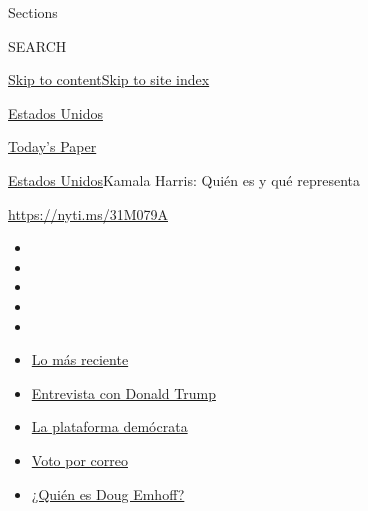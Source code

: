 Sections

SEARCH

\protect\hyperlink{site-content}{Skip to
content}\protect\hyperlink{site-index}{Skip to site index}

\href{https://www.nytimes3xbfgragh.onion/es/section/estados-unidos}{Estados
Unidos}

\href{https://myaccount.nytimes3xbfgragh.onion/auth/login?response_type=cookie\&client_id=vi}{}

\href{https://www.nytimes3xbfgragh.onion/section/todayspaper}{Today's
Paper}

\href{/es/section/estados-unidos}{Estados Unidos}\textbar{}Kamala
Harris: Quién es y qué representa

\url{https://nyti.ms/31M079A}

\begin{itemize}
\item
\item
\item
\item
\item
\end{itemize}

\begin{itemize}
\item
  \href{https://www.nytimes3xbfgragh.onion/es/2020/09/07/espanol/estados-unidos/trump-biden-encuestas-elecciones.html?action=click\&pgtype=Article\&state=default\&region=TOP_BANNER\&context=storylines_menu}{Lo
  más reciente}
\item
  \href{https://www.nytimes3xbfgragh.onion/es/2020/08/31/espanol/estados-unidos/donald-trump.html?action=click\&pgtype=Article\&state=default\&region=TOP_BANNER\&context=storylines_menu}{Entrevista
  con Donald Trump}
\item
  \href{https://www.nytimes3xbfgragh.onion/es/2020/08/21/espanol/estados-unidos/plataforma-democratas-espanol.html?action=click\&pgtype=Article\&state=default\&region=TOP_BANNER\&context=storylines_menu}{La
  plataforma demócrata}
\item
  \href{https://www.nytimes3xbfgragh.onion/es/article/voto-por-correo.html?action=click\&pgtype=Article\&state=default\&region=TOP_BANNER\&context=storylines_menu}{Voto
  por correo}
\item
  \href{https://www.nytimes3xbfgragh.onion/es/2020/09/11/espanol/doug-emhoff-esposo-kamala-harris.html?action=click\&pgtype=Article\&state=default\&region=TOP_BANNER\&context=storylines_menu}{¿Quién
  es Doug Emhoff?}
\end{itemize}

